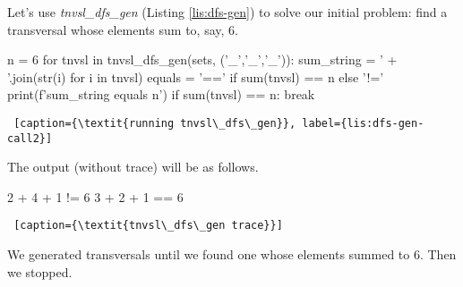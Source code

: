 Let's use \textit{tnvsl\_dfs\_gen} (Listing \ref{lis:dfs-gen}) to solve our initial problem: find a transversal whose elements sum to, say, 6.

\begin{center}
\begin{minipage}[c]{0.45\textwidth}
\begin{python1}
n = 6
for tnvsl in tnvsl_dfs_gen(sets, ('_','_','_')):
  sum_string = ' + '.join(str(i) for i in tnvsl)
  equals = '==' if sum(tnvsl) == n else '!='
  print(f'{sum_string} {equals} {n}')
  if sum(tnvsl) == n: break
\end{python1}\linv
\begin{lstlisting} [caption={\textit{running tnvsl\_dfs\_gen}}, label={lis:dfs-gen-call2}]
\end{lstlisting}
\end{minipage}
\end{center}

The output (without trace) will be as follows.
\begin{center}
\begin{minipage}[c]{0.45\textwidth}
\begin{python1}  
    2 + 4 + 1 != 6
    3 + 2 + 1 == 6
\end{python1}\linv
\begin{lstlisting} [caption={\textit{tnvsl\_dfs\_gen trace}}]
\end{lstlisting}
\end{minipage}
\end{center}
We generated transversals until we found one whose elements summed to 6. Then we stopped.





